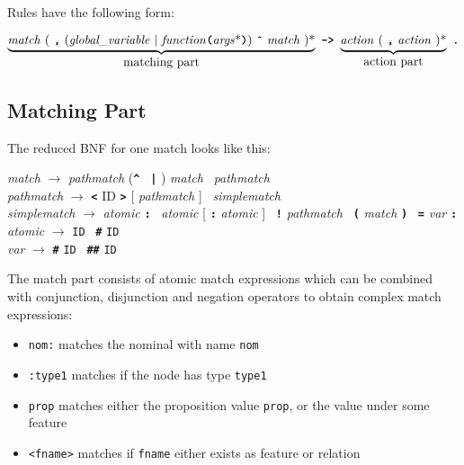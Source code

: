 \documentclass[11pt,a4paper]{article}
\newcommand{\cd}[1]{\texttt{#1}}
\begin{document}
Rules have the following form:
{
\newcommand{\nt}[1]{\emph{#1}}
\newcommand{\tok}[1]{\texttt{\textbf{#1}}}
\newcommand{\id}{\mbox{\texttt{ID}}}
\begin{center}

$\underbrace{\mbox{\nt{match} ( \tok{,}
    (\nt{global\_variable} \textbar\ \nt{function}\tok{(}\nt{args}*\tok{)})
    \tok{\^} \nt{match} )*}}_{\mbox{matching part}} \mbox{\ \tok{->}\ }
\underbrace{\mbox{\nt{action} ( \tok{,} \nt{action} )*}}_{\mbox{action
    part}} \mbox{\ \tok{.}}$

\end{center}

\subsection{Matching Part}
\label{matching_part}
The reduced BNF for one match looks like this:

\begin{flushleft}
\nt{match} $\rightarrow$
  \nt{pathmatch} (\tok{\^{}} \textbar\  \tok{|} ) \nt{match} \textbar\
  \nt{pathmatch}\\
\nt{pathmatch} $\rightarrow$
  \tok{<} ID \tok{>} [ \nt{pathmatch} ] \textbar\
  \nt{simplematch}\\
\nt{simplematch} $\rightarrow$
  \nt{atomic} \tok{:} \textbar\
  \nt{atomic} [ \tok{:} \nt{atomic} ] \textbar\
  \tok{!} \nt{pathmatch} \textbar\
  \tok{(} \nt{match} \tok{)} \textbar\ \tok{=} \nt{var} \tok{:} \\
\nt{atomic} $\rightarrow$
  \mbox{\texttt{ID}} \textbar\
  \tok{\#} \mbox{\texttt{ID}}\\
\nt{var} $\rightarrow$
  \tok{\#} \mbox{\texttt{ID}} \textbar\
  \tok{\#\#} \mbox{\texttt{ID}}\\
\end{flushleft}
}
The match part consists of atomic match expressions which can be combined with
conjunction, disjunction and negation operators to obtain complex match
expressions:

\begin{itemize}
\item \cd{nom:} matches the nominal with name \cd{nom}
\item \cd{:type1} matches if the node has type \cd{type1}
\item \cd{prop} matches either the proposition value \cd{prop}, or the value
  under some feature
\item \cd{<fname>} matches if \cd{fname} either exists as feature or
  relation
\end{itemize}
\end{document}
